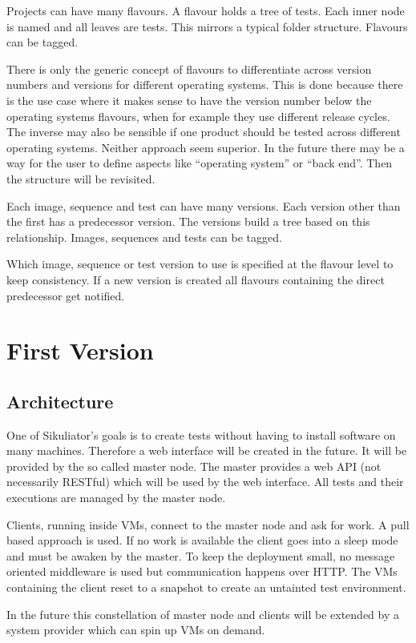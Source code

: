 \documentclass[a4paper,twocolumn]{article}
\newcommand{\Sik}[0]{Sikuliator}
\begin{document}
Projects can have many flavours.
A flavour holds a tree of tests.
Each inner node is named and all leaves are tests.
This mirrors a typical folder structure.
Flavours can be tagged.

There is only the generic concept of flavours to differentiate across version numbers and versions for different operating systems.
This is done because there is the use case where it makes sense to have the version number below the operating systems flavours, when for example they use different release cycles.
The inverse may also be sensible if one product should be tested across different operating systems.
Neither approach seem superior.
In the future there may be a way for the user to define aspects like \enquote{operating system} or \enquote{back end}. Then the structure will be revisited.

Each image, sequence and test can have many versions.
Each version other than the first has a predecessor version.
The versions build a tree based on this relationship.
Images, sequences and tests can be tagged.

Which image, sequence or test version to use is specified at the flavour level to keep consistency.
If a new version is created all flavours containing the direct predecessor get notified.

\section{First Version}
\subsection{Architecture}
One of \Sik{}'s goals is to create tests without having to install software on many machines.
Therefore a web interface will be created in the future.
It will be provided by the so called master node.
The master provides a web API (not necessarily RESTful) which will be used by the web interface.
All tests and their executions are managed by the master node.

Clients, running inside VMs, connect to the master node and ask for work.
A pull based approach is used.
If no work is available the client goes into a sleep mode and must be awaken by the master.
To keep the deployment small, no message oriented middleware is used but communication happens over HTTP.
The VMs containing the client reset to a snapshot to create an untainted test environment.

In the future this constellation of master node and clients will be extended by a system provider which can spin up VMs on demand.
\end{document}
